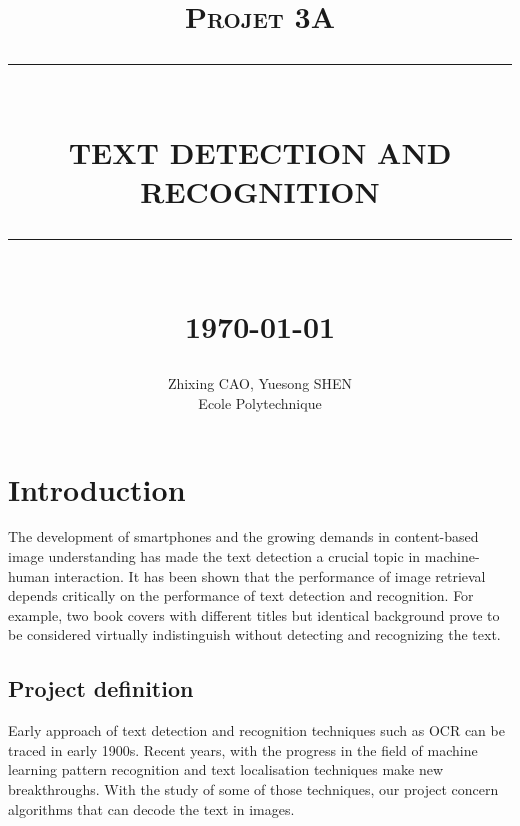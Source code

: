 \documentclass[paper=a4, french, 11pt]{scrartcl}
\newcommand{\HRule}[1]{\rule{\linewidth}{#1}}
\begin{document}
\title{ \normalsize \textsc{Projet 3A}
        \\ [2.0cm]
        \HRule{0.5pt} \\
        \LARGE \textbf{\uppercase{Text detection and recognition}}
        \HRule{2pt} \\ [0.5cm]
        \normalsize \today \vspace*{5\baselineskip}}

\date{}

\author{
        Zhixing CAO, Yuesong SHEN \\
        Ecole Polytechnique }

\maketitle
\newpage
\tableofcontents
\newpage

\sectionfont{\scshape}



\section{Introduction}
The development of smartphones and the growing demands in content-based image understanding has made the text detection a crucial topic in machine-human interaction. It has been shown that the performance of image retrieval depends critically on the performance of text detection and recognition. For example, two book covers with different titles but identical background prove to be considered virtually indistinguish without detecting and recognizing the text.

\subsection{Project definition}
Early approach of text detection and recognition techniques such as OCR can be traced in early 1900s. Recent years, with the progress in the field of machine learning pattern recognition and text localisation techniques make new breakthroughs. With the study of some of those techniques, our project concern algorithms that can decode the text in images.
\end{document}
